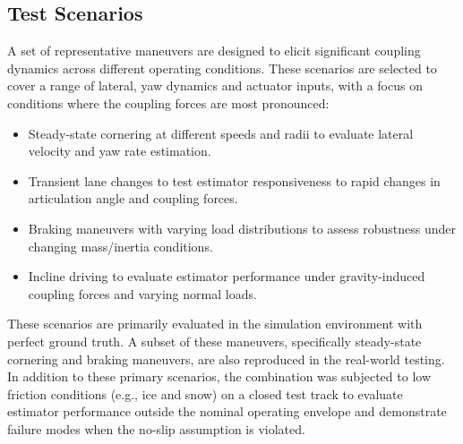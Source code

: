\documentclass[conference]{IEEEtran}
\begin{document}

\subsection{Test Scenarios}
A set of representative maneuvers are designed to elicit significant coupling dynamics across different operating conditions. These scenarios are selected to cover a range of lateral, yaw dynamics and actuator inputs, with a focus on conditions where the coupling forces are most pronounced:
\begin{itemize}
    \item Steady-state cornering at different speeds and radii to evaluate lateral velocity and yaw rate estimation.
    \item Transient lane changes to test estimator responsiveness to rapid changes in articulation angle and coupling forces.
    \item Braking maneuvers with varying load distributions to assess robustness under changing mass/inertia conditions.
    \item Incline driving to evaluate estimator performance under gravity-induced coupling forces and varying normal loads.
\end{itemize}
These scenarios are primarily evaluated in the simulation environment with perfect ground truth. A subset of these maneuvers, specifically steady-state cornering and braking maneuvers, are also reproduced in the real-world testing. In addition to these primary scenarios, the combination was subjected to low friction conditions (e.g., ice and snow) on a closed test track to evaluate estimator performance outside the nominal operating envelope and demonstrate failure modes when the no-slip assumption is violated.
\end{document}
